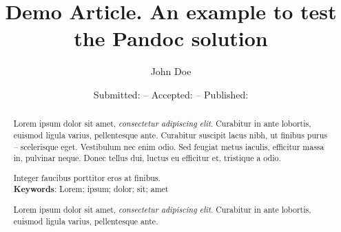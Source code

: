 \documentclass[american,a4paper,]{article}
\title{Demo Article. An example to test the Pandoc solution}
\author{John Doe}
\date{\small Submitted: \DTMdate{2017-02-05} -- Accepted: \DTMdate{2017-06-18} -- Published: \DTMdate{2018-03-01}}
\begin{document}
\maketitle
{}

\begin{abstract}
\setlength{\parindent}{0pt}
\par\noindent Lorem ipsum dolor sit amet, \emph{consectetur adipiscing elit}.
Curabitur in ante lobortis, euismod ligula varius, pellentesque ante.
Curabitur suscipit lacus nibh, ut finibus purus -- scelerisque eget.
Vestibulum nec enim odio. Sed feugiat metus iaculis, efficitur massa in,
pulvinar neque. Donec tellus dui, luctus eu efficitur et, tristique a
odio.

Integer faucibus porttitor eros at finibus.
\vspace{1mm}\\ \textbf{Keywords}: Lorem; ipsum; dolor; sit; amet
\end{abstract}
\vspace{1.5em}
\renewcommand{\abstractname}{Acknowledgements}
\begin{abstract}
\setlength{\parindent}{0pt}
\par\noindent Lorem ipsum dolor sit amet, \emph{consectetur adipiscing elit}.
Curabitur in ante lobortis, euismod ligula varius, pellentesque ante.
\end{abstract}
\end{document}
